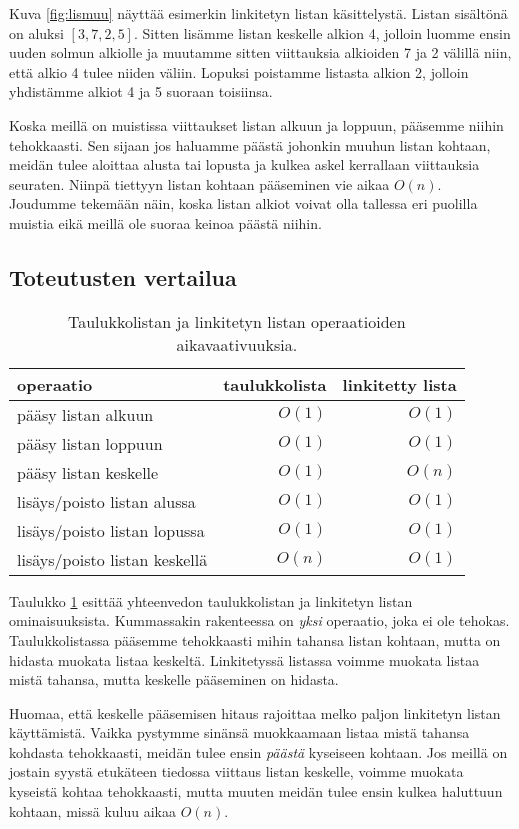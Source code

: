 Kuva \ref{fig:lismuu} näyttää esimerkin linkitetyn listan käsittelystä.
Listan sisältönä on aluksi $[3,7,2,5]$.
Sitten lisämme listan keskelle alkion 4,
jolloin luomme ensin uuden solmun alkiolle ja muutamme
sitten viittauksia alkioiden 7 ja 2 välillä niin,
että alkio 4 tulee niiden väliin.
Lopuksi poistamme listasta alkion 2, jolloin yhdistämme
alkiot 4 ja 5 suoraan toisiinsa.

Koska meillä on muistissa viittaukset listan alkuun ja loppuun,
pääsemme niihin tehokkaasti.
Sen sijaan jos haluamme päästä johonkin muuhun listan kohtaan,
meidän tulee aloittaa alusta tai lopusta ja kulkea askel
kerrallaan viittauksia seuraten.
Niinpä tiettyyn listan kohtaan pääseminen vie aikaa $O(n)$.
Joudumme tekemään näin, koska listan alkiot voivat olla
tallessa eri puolilla muistia eikä meillä ole suoraa keinoa
päästä niihin.

\subsection{Toteutusten vertailua}

\begin{table}
\center
\begin{tabular}{lrr}
operaatio & taulukkolista & linkitetty lista \\
\hline
pääsy listan alkuun & $O(1)$ & $O(1)$ \\
pääsy listan loppuun & $O(1)$ & $O(1)$ \\ 
pääsy listan keskelle &  $O(1)$ & $O(n)$ \\
lisäys/poisto listan alussa & $O(1)$ & $O(1)$ \\
lisäys/poisto listan lopussa & $O(1)$ & $O(1)$ \\ 
lisäys/poisto listan keskellä &  $O(n)$ & $O(1)$ \\
\end{tabular}
\caption{Taulukkolistan ja linkitetyn listan operaatioiden
aikavaativuuksia.}
\label{tab:taulin}
\end{table}

Taulukko \ref{tab:taulin} esittää yhteenvedon taulukkolistan ja
linkitetyn listan ominaisuuksista.
Kummassakin rakenteessa on \emph{yksi} operaatio,
joka ei ole tehokas.
Taulukkolistassa pääsemme tehokkaasti mihin tahansa listan
kohtaan, mutta on hidasta muokata listaa keskeltä.
Linkitetyssä listassa voimme muokata listaa mistä tahansa,
mutta keskelle pääseminen on hidasta.

Huomaa, että keskelle pääsemisen hitaus rajoittaa melko paljon
linkitetyn listan käyttämistä.
Vaikka pystymme sinänsä muokkaamaan listaa mistä tahansa kohdasta
tehokkaasti, meidän tulee ensin \emph{päästä} kyseiseen kohtaan.
Jos meillä on jostain syystä etukäteen tiedossa viittaus listan keskelle,
voimme muokata kyseistä kohtaa tehokkaasti,
mutta muuten meidän tulee ensin kulkea haluttuun kohtaan,
missä kuluu aikaa $O(n)$.


